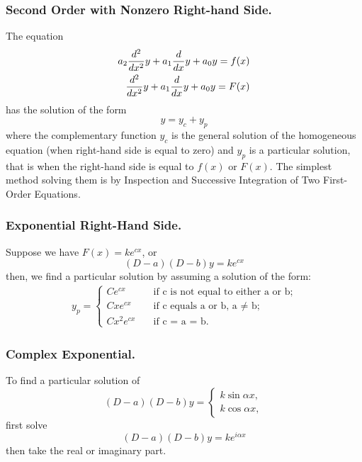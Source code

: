 \documentclass[../main.tex]{subfiles}
\begin{document}
\subsubsection*{Second Order with Nonzero Right-hand Side.} The equation
\begin{align*}
    a_2\frac{d^2}{dx^2} y+a_1\frac{d}{dx} y+a_0y=f(x) \\
    \frac{d^2}{dx^2} y+a_1\frac{d}{dx} y+a_0y=F(x)
\end{align*}
has the solution of the form
\begin{equation*}
    y = y_c + y_p
\end{equation*}
where the complementary function $y_c$ is the general solution of the homogeneous
equation (when right-hand side is equal to zero) and $y_p$ is a particular solution, that is when the right-hand side is equal to $f(x)$ or $F(x)$.
 The simplest method solving them is by Inspection and Successive Integration of Two First-Order Equations.

\subsubsection*{Exponential Right-Hand Side.}
Suppose we have $F (x) = ke^{cx}$, or
\begin{equation*}
    (D - a)(D - b)y =ke^{cx}
\end{equation*}
then, we find a particular solution by
assuming a solution of the form:
\begin{align*}
    y_p=
    \begin{cases}
        Ce^{cx} \quad    & \text{if c is not equal to either a or b;} \\
        Cxe^{cx} \quad   & \text{if c equals a or b, a  $\neq$ b;}    \\
        Cx^2e^{cx} \quad & \text{if c = a = b.}
    \end{cases}
\end{align*}

\subsubsection*{Complex Exponential.} To find a particular solution of
\begin{equation*}
    (D - a)(D - b)y=\begin{cases}
        k\sin \alpha x, \\
        k\cos \alpha x,
    \end{cases}
\end{equation*}
first solve
\begin{equation*}
    (D - a)(D - b)y=ke^{i\alpha x}
\end{equation*}
then take the real or imaginary part.
\end{document}
